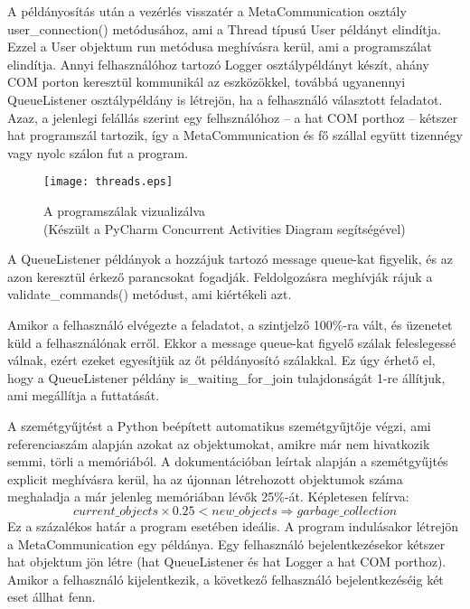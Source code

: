 \documentclass[12pt]{report}
\begin{document}
A példányosítás után a vezérlés visszatér a MetaCommunication osztály user\_connection() metódusához, ami a Thread típusú User példányt elindítja. Ezzel a User objektum run metódusa meghívásra kerül, ami a programszálat elindítja. Annyi felhasználóhoz tartozó Logger osztálypéldányt készít, ahány COM porton keresztül kommunikál az eszközökkel, továbbá ugyanennyi  QueueListener osztálypéldány is létrejön, ha a felhasználó választott feladatot. Azaz, a jelenlegi felállás szerint egy felhsználóhoz -- a hat COM porthoz -- kétszer hat programszál tartozik, így a MetaCommunication és fő szállal együtt tizennégy vagy nyolc szálon fut a program.

\begin{figure}[h]
    \centering
    \texttt{[image: threads.eps]}
    \caption{A programszálak vizualizálva\\(Készült a PyCharm Concurrent Activities Diagram segítségével)}
\end{figure}

A QueueListener példányok a hozzájuk tartozó message queue-kat figyelik, és az azon keresztül érkező parancsokat fogadják. Feldolgozásra meghívják rájuk a validate\_commands() metódust, ami kiértékeli azt.


Amikor a felhasználó elvégezte a feladatot, a szintjelző 100\%-ra vált, és üzenetet küld a felhasználónak erről.
Ekkor a message queue-kat figyelő szálak feleslegessé válnak, ezért ezeket egyesítjük az őt példányosító szálakkal. 
Ez úgy érhető el, hogy a QueueListener példány is\_waiting\_for\_join tulajdonságát 1-re állítjuk, ami megállítja a futtatását.


A szemétgyűjtést a Python beépített automatikus szemétgyűjtője végzi, ami referenciaszám alapján azokat az objektumokat, amikre már nem hivatkozik semmi, törli a memóriából.
A dokumentációban leírtak alapján a szemétgyűjtés explicit meghívásra kerül, ha az újonnan létrehozott objektumok száma meghaladja a már jelenleg memóriában lévők 25\%-át.
Képletesen felírva:
\begin{equation}
    current\_objects \times 0.25 < new\_objects \Rightarrow garbage\_collection
\end{equation}
Ez a százalékos határ a program esetében ideális. A program indulásakor létrejön a MetaCommunication egy példánya.
Egy felhasználó bejelentkezésekor kétszer hat objektum jön létre (hat QueueListener és hat Logger a hat COM porthoz).
Amikor a felhasználó kijelentkezik, a következő felhasználó bejelentkezéséig két eset állhat fenn.
\end{document}
